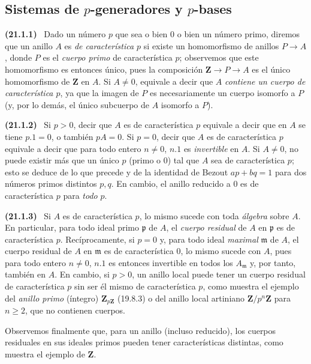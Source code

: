 \documentclass[10pt,oneside]{book}
\makeatletter
\newcommand{\setmanualcurrentlabel}[1]{\def\@currentlabel{#1}}
\newenvironment{env}[1][]{\setmanualcurrentlabel{#1}\par\medskip\noindent\textbf{(#1)}\ }{\par}
\makeatother
\begin{document}
\subsection{Sistemas de $p$-generadores y $p$-bases}
\label{0.21.1-es}

\begin{env}[21.1.1]
\label{0.21.1.1-es}
Dado un número $p$ que sea o bien $0$ o bien un número primo, diremos que un
anillo $A$ es \emph{de característica $p$} si existe un homomorfismo de anillos
$P\to A$, donde $P$ es el \emph{cuerpo primo} de característica $p$; observemos que
este homomorfismo es entonces único, pues la composición
$\mathbf Z\to P\to A$ es el único homomorfismo de $\mathbf Z$ en $A$.
Si $A\neq0$, equivale a decir que $A$ \emph{contiene un cuerpo de característica
$p$}, ya que la imagen de $P$ es necesariamente un cuerpo isomorfo a $P$ (y,
por lo demás, el único subcuerpo de $A$ isomorfo a $P$).
\end{env}

\begin{env}[21.1.2]
\label{0.21.1.2-es}
Si $p>0$, decir que $A$ es de característica $p$ equivale a decir que en
$A$ se tiene $p.1=0$, o también $pA=0$. Si $p=0$, decir que $A$ es de
característica $p$ equivale a decir que para todo entero $n\neq0$, $n.1$
es \emph{invertible} en $A$. Si $A\neq0$, no puede existir más que un único $p$
(primo o $0$) tal que $A$ sea de característica $p$; esto se deduce de lo que precede y de la
identidad de Bezout $ap+bq=1$ para dos números primos distintos $p,q$.
En cambio, el anillo reducido a $0$ es de característica $p$ para \emph{todo} $p$.
\end{env}

\begin{env}[21.1.3]
\label{0.21.1.3-es}
Si $A$ es de característica $p$, lo mismo sucede con toda \emph{álgebra} sobre $A$.
En particular, para todo ideal primo $\mathfrak p$ de $A$, el \emph{cuerpo residual}
de $A$ en $\mathfrak p$ es de característica $p$. Recíprocamente, si $p=0$
y, para todo ideal \emph{maximal} $\mathfrak m$ de $A$, el cuerpo residual de $A$ en
$\mathfrak m$ es de característica $0$, lo mismo sucede con $A$, pues para
todo entero $n\neq0$, $n.1$ es entonces invertible en todos los
$A_{\mathfrak m}$ y, por tanto, también en $A$. En cambio, si $p>0$, un
anillo local puede tener un cuerpo residual de característica $p$ sin ser él
mismo de característica $p$, como muestra el ejemplo del \emph{anillo primo}
(íntegro) $\mathbf Z_{p\mathbf Z}$ (19.8.3) o del anillo local artiniano
$\mathbf Z/p^n\mathbf Z$ para $n\geq2$, que no contienen cuerpos.

Observemos finalmente que, para un anillo (incluso reducido), los cuerpos
residuales en sus ideales primos pueden tener características distintas, como
muestra el ejemplo de $\mathbf Z$.
\end{env}
\end{document}
